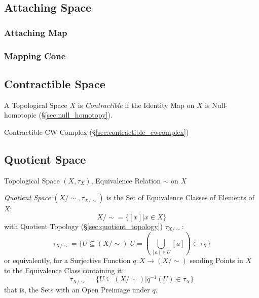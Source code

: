\subsection{Attaching Space}\label{sec:attaching_space}

\subsubsection{Attaching Map}\label{sec:attaching_map}

\subsubsection{Mapping Cone}\label{sec:mapping_cone}



\subsection{Contractible Space}\label{sec:contractible_space}

A Topological Space $X$ is \emph{Contractible} if the Identity Map on
$X$ is Null-homotopic (\S\ref{sec:null_homotopy}).

Contractible CW Complex (\S\ref{sec:contractible_cwcomplex})



\subsection{Quotient Space}\label{sec:quotient_space}

Topological Space $(X, \tau_X)$, Equivalence Relation $\sim$ on $X$

\emph{Quotient Space} $(X/\sim, \tau_{X/\sim})$ is the Set of Equivalence
Classes of Elements of $X$:
\[
  X / \sim = \{ [x] | x \in X \}
\]
with Quotient Topology (\S\ref{sec:quotient_topology}) $\tau_{X/\sim}$:
\[
  \tau_{X/\sim} = \{ U \subseteq (X/\sim) |
    U = (\bigcup_{[a] \in U} [a]) \in \tau_X \}
\]
or equivalently, for a Surjective Function $q : X \rightarrow (X /
\sim)$ sending Points in $X$ to the Equivalence Class containing it:
\[
  \tau_{X/\sim} = \{ U \subseteq (X/\sim) | q^{-1}(U) \in \tau_X \}
\]
that is, the Sets with an Open Preimage under $q$.

